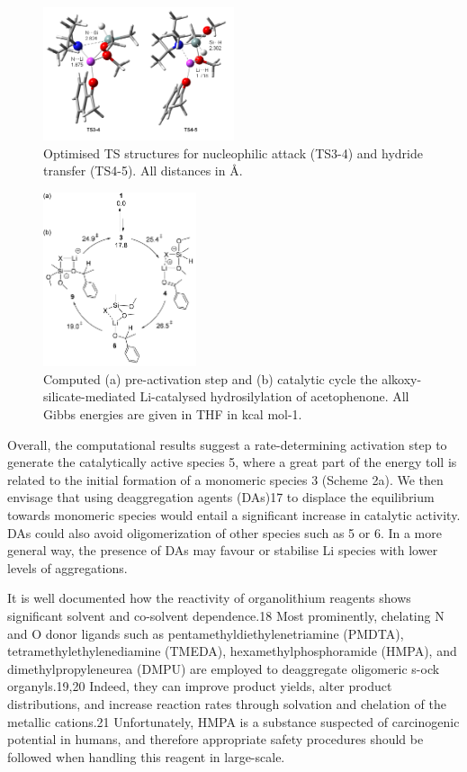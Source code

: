 \documentclass[journal=jacsat,manuscript=article]{achemso}
\begin{document}
	\begin{figure}[H]
		\includegraphics[width=0.5\textwidth]{figures/Nucleophilic attack.PNG}	
		\centering
		\caption{Optimised TS structures for nucleophilic attack (TS3-4) and hydride transfer (TS4-5). All distances in \si{\angstrom}.}
		\label{Figure1}
	\end{figure}	
	
	\begin{figure}[H]
		\includegraphics[width=0.4\textwidth]{figures/Cycle.PNG}		
		\centering
		\caption{Computed (a) pre-activation step and (b) catalytic cycle the alkoxy-silicate-mediated Li-catalysed hydrosilylation of acetophenone. All Gibbs energies are given in THF in kcal mol-1.}
		\label{Scheme 3}
	\end{figure}	
	
	Overall, the computational results suggest a rate-determining activation step to generate the catalytically active species 5, where a great part of the energy toll is related to the initial formation of a monomeric species 3 (Scheme 2a). We then envisage that using deaggregation agents (DAs)17 to displace the equilibrium towards monomeric species would entail a significant	increase in catalytic activity. DAs could also avoid oligomerization of other species such as 5 or 6. In a more general	way, the presence of DAs may favour or stabilise Li species	with lower levels of aggregations. 
	
	It is well documented how the reactivity of organolithium reagents shows significant solvent and co-solvent dependence.18 Most prominently, chelating N and O donor ligands such as pentamethyldiethylenetriamine (PMDTA), tetramethylethylenediamine 	(TMEDA), hexamethylphosphoramide (HMPA), and dimethylpropyleneurea (DMPU) are employed to deaggregate oligomeric s-ock organyls.19,20 Indeed, they can improve product yields, alter product distributions, and increase reaction rates through solvation and chelation of the metallic cations.21 Unfortunately, HMPA is a substance suspected	of carcinogenic potential in humans, and therefore appropriate safety procedures should be followed when handling this reagent in large-scale. 
	
\end{document}

